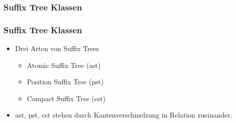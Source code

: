 \documentclass{beamer}
\begin{document}
\subsubsection{Suffix Tree Klassen}

\begin{frame}
\frametitle{Suffix Tree Klassen}
\begin{itemize}
    \item Drei Arten von Suffix Trees
    \begin{itemize}
        \item Atomic Suffix Tree (ast)
        \item Position Suffix Tree (pst)
        \item Compact Suffix Tree (cst)
    \end{itemize}
    \item ast, pst, cst stehen durch Kantenverschmelzung in Relation zueinander.
\end{itemize}
\end{frame}
\end{document}
